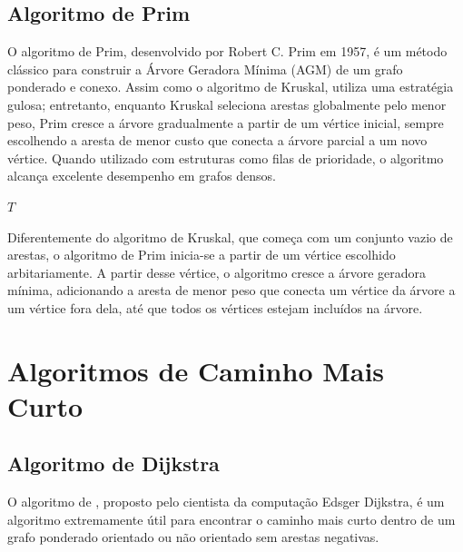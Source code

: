 \subsection{Algoritmo de Prim}
\label{sec:pseudocode_prim}

O algoritmo de Prim, desenvolvido por Robert C. Prim em 1957, é um
método clássico para construir a Árvore Geradora Mínima (AGM) de um
grafo ponderado e conexo. Assim como o algoritmo de Kruskal, utiliza
uma estratégia gulosa; entretanto, enquanto Kruskal seleciona arestas
globalmente pelo menor peso, Prim cresce a árvore gradualmente a
partir de um vértice inicial, sempre escolhendo a aresta de menor
custo que conecta a árvore parcial a um novo vértice. Quando
utilizado com estruturas como filas de prioridade, o algoritmo
alcança excelente desempenho em grafos densos.

\begin{algorithm}
  \caption{Algoritmo de Prim}
  \begin{algorithmic}[0]
    \Statex
      \EndWhile
      \State \Return $T$
    \EndFunction
  \end{algorithmic}
\end{algorithm}
\FloatBarrier

Diferentemente do algoritmo de Kruskal, que começa com um conjunto vazio
de arestas, o algoritmo de Prim inicia-se a partir de um vértice escolhido
arbitariamente. A partir desse vértice, o algoritmo cresce a árvore
geradora mínima, adicionando a aresta de menor peso que conecta um
vértice da árvore a um vértice fora dela, até que todos os vértices
estejam incluídos na árvore.

\section{Algoritmos de Caminho Mais Curto}

\subsection{Algoritmo de Dijkstra}
\label{sec:pseudocode_dijkstra}
O algoritmo de \cite{dijkstraarticle}, proposto pelo cientista da
computação Edsger Dijkstra, é um algoritmo extremamente útil para
encontrar o caminho mais curto dentro de um grafo ponderado orientado
ou não orientado sem arestas negativas.

